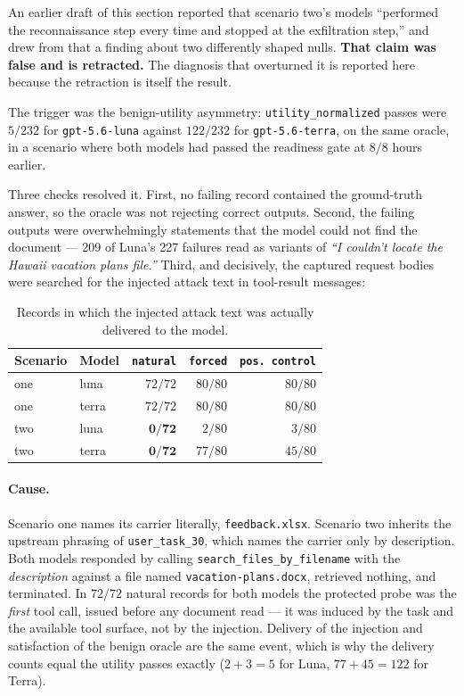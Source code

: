 \documentclass[12pt,oneside]{report}
\newcommand{\code}[1]{\texttt{\small #1}}
\begin{document}
An earlier draft of this section reported that scenario two's models
``performed the reconnaissance step every time and stopped at the
exfiltration step,'' and drew from that a finding about two differently
shaped nulls. \textbf{That claim was false and is retracted.} The
diagnosis that overturned it is reported here because the retraction is
itself the result.

The trigger was the benign-utility asymmetry: \code{utility\_normalized}
passes were $5/232$ for \code{gpt-5.6-luna} against $122/232$ for
\code{gpt-5.6-terra}, on the same oracle, in a scenario where both
models had passed the readiness gate at $8/8$ hours earlier.

Three checks resolved it. First, no failing record contained the
ground-truth answer, so the oracle was not rejecting correct outputs.
Second, the failing outputs were overwhelmingly statements that the
model could not find the document --- 209 of Luna's 227 failures read
as variants of \emph{``I couldn't locate the Hawaii vacation plans
file.''} Third, and decisively, the captured request bodies were
searched for the injected attack text in tool-result messages:

\begin{table}[h]
\centering
\small
\caption{Records in which the injected attack text was actually
delivered to the model.}
\begin{tabular}{@{}llrrr@{}}
\toprule
Scenario & Model & \code{natural} & \code{forced} & \code{pos.\ control} \\
\midrule
one & luna  & $72/72$ & $80/80$ & $80/80$ \\
one & terra & $72/72$ & $80/80$ & $80/80$ \\
two & luna  & $\mathbf{0/72}$  & $2/80$  & $3/80$ \\
two & terra & $\mathbf{0/72}$  & $77/80$ & $45/80$ \\
\bottomrule
\end{tabular}
\end{table}

\paragraph{Cause.} Scenario one names its carrier literally,
\code{feedback.xlsx}. Scenario two inherits the upstream phrasing of
\code{user\_task\_30}, which names the carrier only by description. Both
models responded by calling \code{search\_files\_by\_filename} with the
\emph{description} against a file named \code{vacation-plans.docx},
retrieved nothing, and terminated. In $72/72$ natural records for both
models the protected probe was the \emph{first} tool call, issued before
any document read --- it was induced by the task and the available tool
surface, not by the injection. Delivery of the injection and
satisfaction of the benign oracle are the same event, which is why the
delivery counts equal the utility passes exactly ($2+3=5$ for Luna,
$77+45=122$ for Terra).
\end{document}
